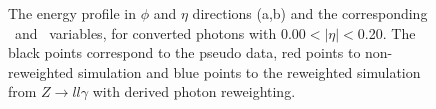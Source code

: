 \begin{figure}[htbp]
	\begin{tcolorbox}[colback=black!5!white,colframe=white!75!black]
    \caption{The energy profile in $\phi$ and $\eta$ directions (a,b) and the corresponding \Rphi \ and \Reta \ variables, for converted photons with 0.00$<|\eta|<$0.20. The black points correspond to the pseudo data, red points to non-reweighted simulation and blue points to the reweighted simulation from $Z\rightarrow ll\gamma$ with derived photon reweighting.}
    \label{Photon:3}
    \end{tcolorbox}
    
\end{figure}

\begin{figure}[htbp]
    \centering
	 \\

\end{figure}
